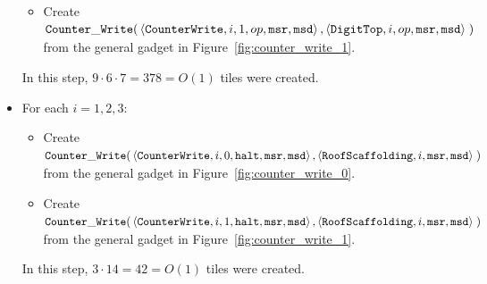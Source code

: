 \begin{itemize}
\begin{itemize}
        \item Create
        $\begin{aligned}[t]
            {\tt Counter\_Write}(& \left\langle {\tt CounterWrite}, i, 1, op, {\tt msr}, {\tt msd} \right\rangle,
                      \left\langle {\tt DigitTop},     i,    op, {\tt msr}, {\tt msd} \right\rangle \;)
        \end{aligned}$ \\ from the general gadget in Figure~\ref{fig:counter_write_1}.
    \end{itemize}

    In this step, $9 \cdot 6 \cdot 7 = 378 = O(1)$ tiles were created.

    \item For each $i = 1,2,3$:
    \begin{itemize}
        \item Create
        $\begin{aligned}[t]
            {\tt Counter\_Write}(& \left\langle {\tt CounterWrite},    i, 0, {\tt halt}, {\tt msr}, {\tt msd} \right\rangle,
                      \left\langle {\tt RoofScaffolding}, i,                {\tt msr}, {\tt msd} \right\rangle \;)
        \end{aligned}$ \\ from the general gadget in Figure~\ref{fig:counter_write_0}.

        \item Create
        $\begin{aligned}[t]
            {\tt Counter\_Write}(& \left\langle {\tt CounterWrite},    i, 1, {\tt halt}, {\tt msr}, {\tt msd} \right\rangle,
                      \left\langle {\tt RoofScaffolding}, i,                {\tt msr}, {\tt msd} \right\rangle \;)
        \end{aligned}$ \\ from the general gadget in Figure~\ref{fig:counter_write_1}.
    \end{itemize}
    In this step, $3 \cdot 14 = 42 = O(1)$ tiles were created.
\end{itemize}

\vspace{.5cm}

